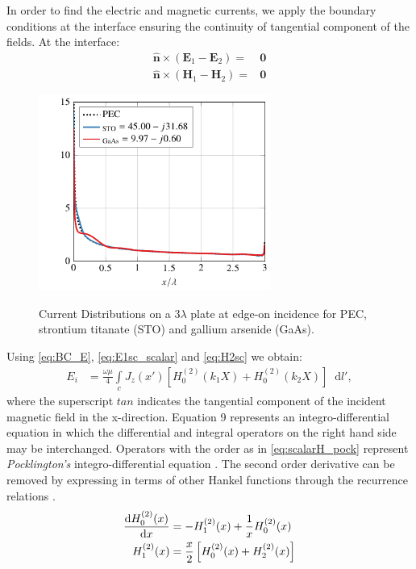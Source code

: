 \documentclass{ieeeaccess}
\renewcommand{\v}[1]{\mathbf{#1}} %
\renewcommand{\O}{\omega}  %
\renewcommand{\u}{\mu}  %
\newcommand{\x}{\times}  %
\renewcommand{\^}{\hat}  %
\newcommand*\diff{\mathop{}\!\mathrm{d}} %
\begin{document}
% 
In order to find the electric and magnetic currents, we apply the boundary conditions at the interface ensuring the continuity of tangential component of the fields. At the interface:
%
\begin{subequations}
  \begin{align}
    \^{\v n} \x (\v E_1 - \v E_2) ={}& \v 0
    \label{eq:BC_E}\\
    \^{\v n} \x (\v H_1 - \v H_2) ={}& \v 0
    \label{eq:BC_H}
  \end{align}
  \label{eq:BC}%
\end{subequations}%
%
\begin{figure}[!t]
  \centering
  {\includegraphics[width=3in]{current_edgeon_3.pdf}
      }
  \caption{Current Distributions on a $3\lambda$ plate at edge-on incidence for PEC, strontium titanate (STO) and gallium arsenide (GaAs).}
  \label{fig:edgeon}
\end{figure}
% 
Using \eqref{eq:BC_E}, \eqref{eq:E1sc_scalar} and \eqref{eq:H2sc} we obtain:
%
\begin{align}
  E_i &= \frac{\O \u}{4} \int\limits_c J_z(x') \left[ H_0^{(2)}(k_1 X) + H_0^{(2)}(k_2 X)\right] \diff{l'},
  \label{eq:scalarE}
\end{align}
where the superscript $tan$ indicates the tangential component of the incident magnetic field in the x-direction. Equation 9 represents an integro-differential equation in which the differential and integral operators on the right hand side may be interchanged. Operators with the order as in \eqref{eq:scalarH_pock} represent \emph{Pocklington's} integro-differential equation \cite{Stutzman2012}. The second order derivative can be removed by expressing in terms of other Hankel functions through the recurrence relations \cite[p. 361]{Abramowitz2012}.
%
\begin{subequations}
  \begin{align}
    \dv{H_0^{(2)}(x)}{x} &= -H_{1}^{(2)}(x) + \frac{1}{x} H_0^{(2)}(x)
    \label{eq:Hankel_ID1}\\
    H_{1}^{(2)}(x)  &= \frac{x}{2} \left[H_{0}^{(2)}(x) + H_{2}^{(2)}(x)\right]
    \label{eq:Hankel_ID2}
  \end{align}
  \label{eq:Hankel_ID}%
\end{subequations}%
%
\end{document}
